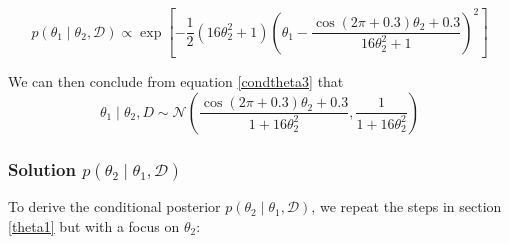\documentclass[12pt]{article}
\begin{document}
\begin{enumerate}
\begin{equation} \label{condtheta3}
p(\theta_1 \mid \theta_2, \mathcal{D}) \propto \exp\left[-\frac{1}{2}(16\theta_2^2 + 1)\left(\theta_1 - \frac{\cos(2\pi + 0.3)\theta_2 + 0.3}{16\theta_2^2 + 1}\right)^2\right]
\end{equation}

We can then conclude from equation \ref{condtheta3} that
\begin{equation}\label{condtheta4}
\theta_1 \mid \theta_2, D \sim \mathcal{N} \left( \frac{\cos(2\pi+0.3)\theta_2 + 0.3}{1 + 16\theta_2^2}, \frac{1}{1 + 16\theta_2^2} \right)
\end{equation}
\end{enumerate}



\subsubsection{Solution \(p(\theta_2 \mid \theta_1, \mathcal{D})\) }
To derive the conditional posterior \(p(\theta_2 \mid \theta_1, \mathcal{D})\), we repeat the steps in section \ref{theta1} but with a focus on $\theta_2$:
\end{document}
